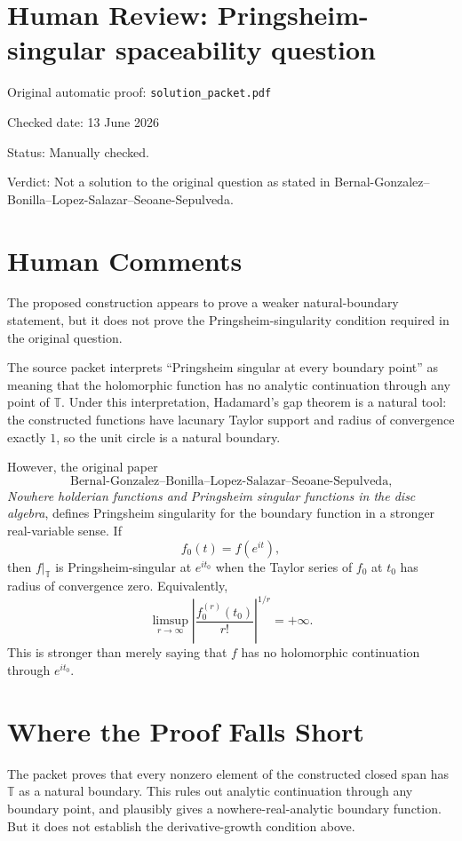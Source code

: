 \documentclass[11pt]{article}
\newcommand{\T}{\mathbb T}
\begin{document}
\section*{Human Review: Pringsheim-singular spaceability question}

\noindent Original automatic proof: \texttt{solution\_packet.pdf}

\noindent Checked date: 13 June 2026

\noindent Status: Manually checked.

\noindent Verdict: Not a solution to the original question as stated in
Bernal-Gonzalez--Bonilla--Lopez-Salazar--Seoane-Sepulveda.

\section*{Human Comments}

The proposed construction appears to prove a weaker natural-boundary
statement, but it does not prove the Pringsheim-singularity condition required
in the original question.

The source packet interprets ``Pringsheim singular at every boundary point''
as meaning that the holomorphic function has no analytic continuation through
any point of \(\T\). Under this interpretation, Hadamard's gap theorem is a
natural tool: the constructed functions have lacunary Taylor support and
radius of convergence exactly \(1\), so the unit circle is a natural boundary.

However, the original paper
\[
\text{Bernal-Gonzalez--Bonilla--Lopez-Salazar--Seoane-Sepulveda,}
\]
\emph{Nowhere holderian functions and Pringsheim singular functions in the
disc algebra}, defines Pringsheim singularity for the boundary function in a
stronger real-variable sense. If
\[
  f_0(t)=f(e^{it}),
\]
then \(f|_{\T}\) is Pringsheim-singular at \(e^{it_0}\) when the Taylor series
of \(f_0\) at \(t_0\) has radius of convergence zero. Equivalently,
\[
  \limsup_{r\to\infty}
  \left|
    \frac{f_0^{(r)}(t_0)}{r!}
  \right|^{1/r}
  =
  +\infty.
\]
This is stronger than merely saying that \(f\) has no holomorphic continuation
through \(e^{it_0}\).

\section*{Where the Proof Falls Short}

The packet proves that every nonzero element of the constructed closed span
has \(\T\) as a natural boundary. This rules out analytic continuation through
any boundary point, and plausibly gives a nowhere-real-analytic boundary
function. But it does not establish the derivative-growth condition above.
\end{document}
